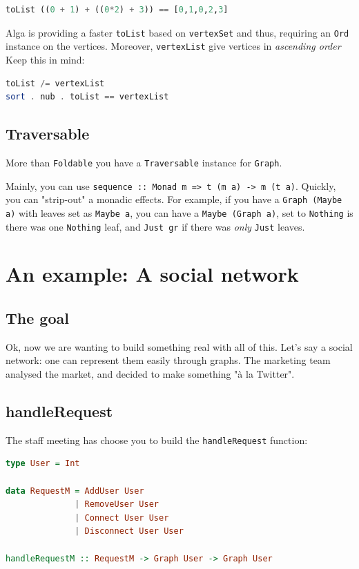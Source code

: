 \documentclass[10pt,a4paper]{article}
\begin{document}
\begin{lstlisting}[language=Haskell, frame=single]
toList ((0 + 1) + ((0*2) + 3)) == [0,1,0,2,3]
\end{lstlisting}

Alga is providing a faster \verb|toList| based on \verb|vertexSet| and thus, requiring an \verb|Ord| instance on the vertices. Moreover, \verb|vertexList| give vertices in \emph{ascending order}
\\
Keep this in mind:
\begin{lstlisting}[language=Haskell, frame=single]
toList /= vertexList
sort . nub . toList == vertexList
\end{lstlisting}

\subsection{Traversable}
More than \verb|Foldable| you have a \verb|Traversable| instance for \verb|Graph|.

Mainly, you can use \verb|sequence :: Monad m => t (m a) -> m (t a)|. Quickly, you can "strip-out" a monadic effects. For example, if you have a \verb|Graph (Maybe a)| with leaves set as \verb|Maybe a|, you can have a \verb|Maybe (Graph a)|, set to \verb|Nothing| is there was one \verb|Nothing| leaf, and \verb|Just gr| if there was \emph{only} \verb|Just| leaves.

\section{An example: A social network}
\subsection{The goal}

Ok, now we are wanting to build something real with all of this. Let's say a social network: one can represent them easily through graphs.
The marketing team analysed the market, and decided to make something "à la Twitter". 

\subsection{handleRequest}
The staff meeting has choose you to build the \verb|handleRequest| function:
\begin{lstlisting}[language=Haskell, frame=single]
type User = Int

data RequestM = AddUser User
			  | RemoveUser User
			  | Connect User User
			  | Disconnect User User

handleRequestM :: RequestM -> Graph User -> Graph User
\end{lstlisting}
\end{document}
